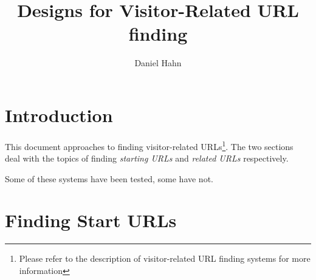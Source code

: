\documentclass[a4paper]{danarticle}
\begin{document}
  \author{Daniel Hahn}
  \title{Designs for Visitor-Related URL finding}
  \maketitle
  
  \section*{Introduction}
    This document approaches to finding visitor-related URLs\footnote{Please
    refer to the description of visitor-related URL finding systems for 
    more information}. The two sections deal with the topics of
    finding \textit{starting URLs} and \textit{related URLs} respectively.
    
    Some of these systems have been tested, some have not.
    \section*{Finding Start URLs}
\end{document}
